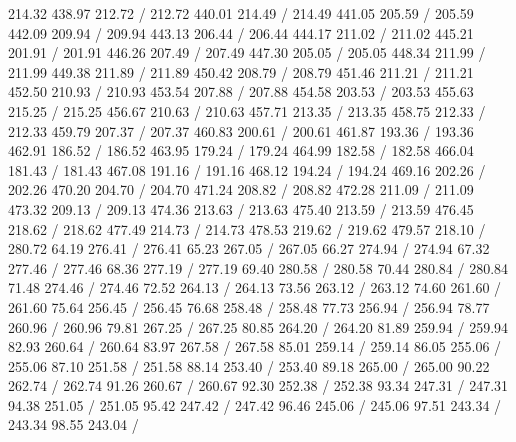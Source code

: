 { 214.32 438.97 212.72 /
 212.72 440.01 214.49 /
 214.49 441.05 205.59 /
 205.59 442.09 209.94 /
 209.94 443.13 206.44 /
 206.44 444.17 211.02 /
 211.02 445.21 201.91 /
 201.91 446.26 207.49 /
 207.49 447.30 205.05 /
 205.05 448.34 211.99 /
 211.99 449.38 211.89 /
 211.89 450.42 208.79 /
 208.79 451.46 211.21 /
 211.21 452.50 210.93 /
 210.93 453.54 207.88 /
 207.88 454.58 203.53 /
 203.53 455.63 215.25 /
 215.25 456.67 210.63 /
 210.63 457.71 213.35 /
 213.35 458.75 212.33 /
 212.33 459.79 207.37 /
 207.37 460.83 200.61 /
 200.61 461.87 193.36 /
 193.36 462.91 186.52 /
 186.52 463.95 179.24 /
 179.24 464.99 182.58 /
 182.58 466.04 181.43 /
 181.43 467.08 191.16 /
 191.16 468.12 194.24 /
 194.24 469.16 202.26 /
 202.26 470.20 204.70 /
 204.70 471.24 208.82 /
 208.82 472.28 211.09 /
 211.09 473.32 209.13 /
 209.13 474.36 213.63 /
 213.63 475.40 213.59 /
 213.59 476.45 218.62 /
 218.62 477.49 214.73 /
 214.73 478.53 219.62 /
 219.62 479.57 218.10 /
\setsolid
{} 280.72 64.19 276.41 /
 276.41 65.23 267.05 /
 267.05 66.27 274.94 /
 274.94 67.32 277.46 /
 277.46 68.36 277.19 /
 277.19 69.40 280.58 /
 280.58 70.44 280.84 /
 280.84 71.48 274.46 /
 274.46 72.52 264.13 /
 264.13 73.56 263.12 /
 263.12 74.60 261.60 /
 261.60 75.64 256.45 /
 256.45 76.68 258.48 /
 258.48 77.73 256.94 /
 256.94 78.77 260.96 /
 260.96 79.81 267.25 /
 267.25 80.85 264.20 /
 264.20 81.89 259.94 /
 259.94 82.93 260.64 /
 260.64 83.97 267.58 /
 267.58 85.01 259.14 /
 259.14 86.05 255.06 /
 255.06 87.10 251.58 /
 251.58 88.14 253.40 /
 253.40 89.18 265.00 /
 265.00 90.22 262.74 /
 262.74 91.26 260.67 /
 260.67 92.30 252.38 /
 252.38 93.34 247.31 /
 247.31 94.38 251.05 /
 251.05 95.42 247.42 /
 247.42 96.46 245.06 /
 245.06 97.51 243.34 /
 243.34 98.55 243.04 /
}
